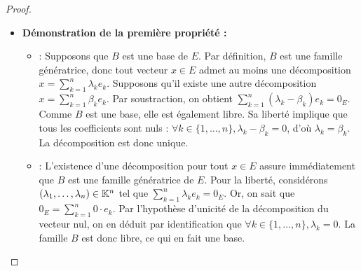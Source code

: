 \documentclass[12pt, a4paper]{report}
\begin{document}
\begin{proof}
    \begin{itemize}
        \item \textbf{Démonstration de la première propriété :}
        \begin{itemize}
            \item[$\implies$] : Supposons que $B$ est une base de $E$. Par définition, $B$ est une famille génératrice, donc tout vecteur $x \in E$ admet au moins une décomposition $x = \sum_{k=1}^n \lambda_k e_k$. Supposons qu'il existe une autre décomposition $x = \sum_{k=1}^n \beta_k e_k$. Par soustraction, on obtient $\sum_{k=1}^n (\lambda_k - \beta_k) e_k = 0_E$. Comme $B$ est une base, elle est également libre. Sa liberté implique que tous les coefficients sont nuls : $\forall k \in \{1,\dots,n\}, \lambda_k - \beta_k = 0$, d'où $\lambda_k = \beta_k$. La décomposition est donc unique.
            \item[$\impliedby$] : L'existence d'une décomposition pour tout $x \in E$ assure immédiatement que $B$ est une famille génératrice de $E$. Pour la liberté, considérons $(\lambda_1,\dots,\lambda_n) \in \mathbb{K}^n$ tel que $\sum_{k=1}^n \lambda_k e_k = 0_E$. Or, on sait que $0_E = \sum_{k=1}^n 0 \cdot e_k$. Par l'hypothèse d'unicité de la décomposition du vecteur nul, on en déduit par identification que $\forall k \in \{1,\dots,n\}, \lambda_k = 0$. La famille $B$ est donc libre, ce qui en fait une base.
        \end{itemize}


\end{itemize}
\end{proof}
\end{document}
